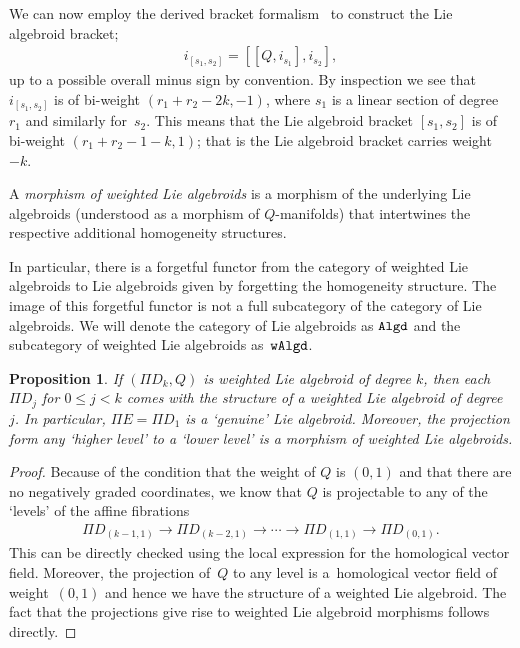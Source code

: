 \documentclass[10pt,a4paper]{amsart}
\newcommand{\catname}[1]{\textnormal{\texttt{#1}}}
\numberwithin{equation}{section}
\newtheorem{Proposition}[Theorem]{Proposition}
 { \theoremstyle{definition}
\newtheorem{Definition}[Theorem]{Definition}
\newtheorem{Example}[Theorem]{Example}
\newtheorem{Remark}[Theorem]{Remark} }
\begin{document}
We can now employ the derived bracket formalism~\cite{Kosmann-Schwarzbach:2004} to construct the Lie algebroid bracket;
\begin{gather*}%
i_{[s_{1}, s_{2}]} = [[Q, i_{s_{1}}], i_{s_{2}}],
\end{gather*}
 up to a possible overall minus sign by convention. By inspection we see that $i_{[s_{1}, s_{2}]}$ is of bi-weight $(r_{1}+ r_{2}- 2k, -1)$, where $s_{1}$ is a linear section of degree~$r_{1}$ and similarly for~$s_{2}$. This  means that the Lie algebroid bracket $[s_{1},s_{2}]$ is of bi-weight $(r_{1} + r_{2}-1 -k, 1)$; that is the Lie algebroid bracket carries weight~$-k$.


\begin{Definition}
A \emph{morphism of weighted Lie algebroids} is a morphism of the underlying Lie algebroids (understood as a morphism of $Q$-manifolds) that intertwines the respective additional homogeneity structures.
\end{Definition}

 In particular,  there is a forgetful functor from the category of weighted Lie algebroids to Lie algebroids given by forgetting the homogeneity structure. The image of this forgetful functor is  not a full subcategory of the category of Lie algebroids.  We will denote the category of Lie algebroids as $\catname{Algd}$ and the subcategory of weighted Lie algebroids as~$\catname{wAlgd}$.


 \begin{Proposition}\label{prop:algebroid tower}
 If $(\Pi D_{k}, Q)$ is weighted Lie algebroid of degree $k$, then each $\Pi D_{j}$ for $0\leq j < k$ comes with the structure of a weighted Lie algebroid of degree $j$. In particular, $\Pi E = \Pi D_{1}$ is a `genuine' Lie algebroid. Moreover,  the projection form any `higher level' to a `lower level' is a morphism of weighted Lie algebroids.
  \end{Proposition}

 \begin{proof}
 Because of the condition that the weight of $Q$ is $(0,1)$ and that there are no negatively graded coordinates, we know that $Q$ is projectable to any of the `levels' of the af\/f\/ine f\/ibrations
 \begin{gather}\label{eqn:levels}
 \Pi D_{(k-1,1)} \rightarrow \Pi D_{(k-2, 1)} \rightarrow \cdots \rightarrow \Pi D_{(1,1)} \rightarrow \Pi D_{(0,1)}.
  \end{gather}
  \noindent This can be directly checked using the local expression for the homological vector f\/ield. Moreover, the projection of~$Q$ to any level is a~homological vector f\/ield of weight~$(0,1)$ and hence we have  the structure of a weighted Lie algebroid. The fact that the projections give rise to weighted Lie algebroid morphisms follows directly.
 \end{proof}
\end{document}

